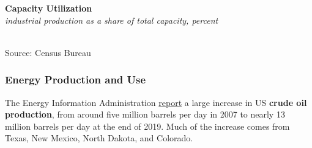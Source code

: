 \documentclass{report}
\makeatletter
\newcommand{\tbllink}[1]{\href{https://raw.githubusercontent.com/bdecon/US-chartbook/master/chartbook/data/#1}{\faTable}}
\newcommand*\short[1]{\expandafter\@gobbletwo\number\numexpr#1\relax}
\newcommand{\stdnode}[3]{\node[below, align=left, shift=({#1,#2})]{#3};}
\newcommand{\dateaxisticks}{
		date coordinates in=x, axis line style={draw=none},
		xmax={2022-01-30},
		max space between ticks=40,	    
		xtick={{1990-01-01}, {1992-01-01}, {1994-01-01}, 
			{1996-01-01}, {1998-01-01}, {2000-01-01}, 
			{2002-01-01}, {2004-01-01}, {2006-01-01},
			{2008-01-01}, {2010-01-01}, {2012-01-01}, {2014-01-01},
		    {2016-01-01}, {2018-01-01}, {2020-01-01}, {2022-01-01}},
		minor xtick={{1989-01-01}, {1991-01-01}, {1993-01-01},
			{1995-01-01}, {1997-01-01}, {1999-01-01}, 
			{2001-01-01}, {2003-01-01}, {2005-01-01}, {2007-01-01},
		    {2009-01-01}, {2011-01-01}, {2013-01-01}, {2015-01-01},
		    {2017-01-01}, {2019-01-01}, {2021-01-01}},
		enlarge y limits={0.06}, enlarge x limits={0.01},
		}
\newcommand{\bbar}[2]{extra #1 ticks = {{#2}}, extra #1 tick labels = ,
		extra #1 tick style = {grid=major, grid style={thick, black!25}},}
\newcommand{\stdline}[4]{\addplot[very thick, no markers, color=#1] 
		table [x=#2, y=#3, col sep=comma] {#4};	}
\newcommand{\thinline}[4]{\addplot[no markers, color=#1] 
		table [x=#2, y=#3, col sep=comma] {#4};	}
\newcommand{\rbars}{
		\fill[color=black!10] (axis cs:{1990-07-01},\pgfkeysvalueof{/pgfplots/ymin}) rectangle 
			(axis cs:{1991-03-01}, \pgfkeysvalueof{/pgfplots/ymax});
		\fill[color=black!10] (axis cs:{2007-12-01},\pgfkeysvalueof{/pgfplots/ymin}) rectangle 
			(axis cs:{2009-07-01}, \pgfkeysvalueof{/pgfplots/ymax});
		\fill[color=black!10] (axis cs:{2001-03-01},\pgfkeysvalueof{/pgfplots/ymin}) rectangle 
			(axis cs:{2001-11-01}, \pgfkeysvalueof{/pgfplots/ymax});
		\fill[color=black!10] (axis cs:{2020-02-01},\pgfkeysvalueof{/pgfplots/ymin}) rectangle 
			(axis cs:{2020-05-01}, \pgfkeysvalueof{/pgfplots/ymax});}
\makeatother
\begin{document}
{\begin{minipage}{0.76\textwidth}
\normalsize \textbf{Capacity Utilization}\\
\footnotesize{\textit{industrial production as a share of total capacity, percent}}\\
\hspace*{-2mm} \\
\footnotesize{Source: Census Bureau} \hfill \tbllink{tcu.csv}
\end{minipage}
\newpage
\subsubsection*{\color{black!70} \seriffont Energy Production and Use}
\begin{minipage}{0.76\textwidth}
\small The Energy Information Administration \href{https://www.eia.gov/dnav/pet/pet_crd_crpdn_adc_mbblpd_m.htm}{report} a large increase in US \textbf{crude oil production}, from around five million barrels per day in 2007 to nearly 13 million barrels per day at the end of 2019. Much of the increase comes from Texas, New Mexico, North Dakota, and Colorado. 
\vspace{1mm}


\end{minipage}}
\end{document}
